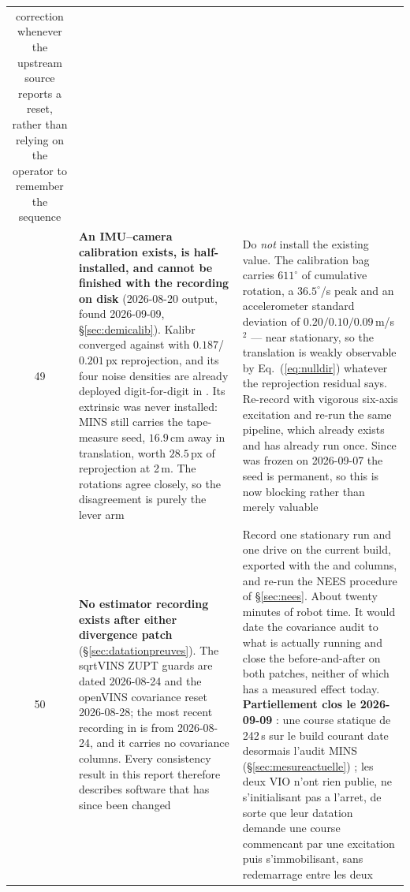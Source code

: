 \begin{longtable}{@{}cL{6.2cm}L{6.8cm}@{}}
    correction whenever the upstream source reports a reset, rather than
    relying on the operator to remember the sequence \\
49 & \textbf{An IMU--camera calibration exists, is half-installed, and
    cannot be finished with the recording on disk} (2026-08-20 output,
    found 2026-09-09, \S\ref{sec:demicalib}). Kalibr converged against
     with $0.187$/$0.201$\,px reprojection, and its
    four noise densities are already deployed digit-for-digit in
    . Its extrinsic was never installed: MINS still
    carries the tape-measure seed, $16.9$\,cm away in translation, worth
    $28.5$\,px of reprojection at 2\,m. The rotations agree closely, so the
    disagreement is purely the lever arm &
    Do \emph{not} install the existing value. The calibration bag carries
    $611^\circ$ of cumulative rotation, a $36.5^\circ$/s peak and an
    accelerometer standard deviation of $0.20/0.10/0.09$\,m/s$^2$ --- near
    stationary, so the translation is weakly observable by
    Eq.~(\ref{eq:nulldir}) whatever the reprojection residual says.
    Re-record with vigorous six-axis excitation and re-run the same
    pipeline, which already exists and has already run once. Since
     was frozen on 2026-09-07 the seed is permanent,
    so this is now blocking rather than merely valuable \\
50 & \textbf{No estimator recording exists after either divergence
    patch} (\S\ref{sec:datationpreuves}). The sqrtVINS ZUPT guards are
    dated 2026-08-24 and the openVINS covariance reset 2026-08-28; the most
    recent recording in  is from 2026-08-24, and it carries no
    covariance columns. Every consistency result in this report therefore
    describes software that has since been changed &
    Record one stationary run and one drive on the current build, exported
    with the  and  columns, and re-run the NEES
    procedure of \S\ref{sec:nees}. About twenty minutes of robot time. It
    would date the covariance audit to what is actually running and close
    the before-and-after on both patches, neither of which has a measured
    effect today. \textbf{Partiellement clos le 2026-09-09} : une course
    statique de 242\,s sur le build courant date desormais l'audit MINS
    (\S\ref{sec:mesureactuelle}) ; les deux VIO n'ont rien publie, ne
    s'initialisant pas a l'arret, de sorte que leur datation demande une
    course commencant par une excitation puis s'immobilisant, sans
    redemarrage entre les deux \\
\end{longtable}

